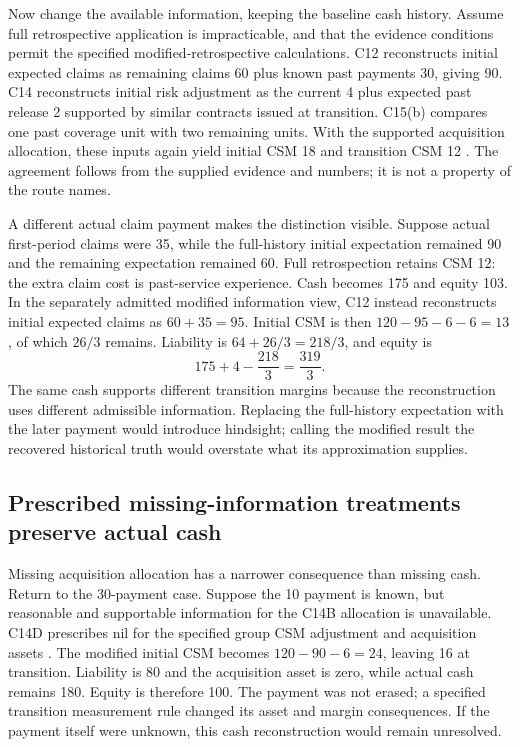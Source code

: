 Now change the available information, keeping the baseline cash history.
Assume full retrospective application is impracticable, and that the evidence
conditions permit the specified modified-retrospective calculations. C12
reconstructs initial expected claims as remaining claims 60 plus known past
payments 30, giving 90. C14 reconstructs initial risk adjustment as the current
4 plus expected past release 2 supported by similar contracts issued at
transition. C15(b) compares one past coverage unit with two remaining units.
With the supported acquisition allocation, these inputs again yield initial
CSM 18 and transition CSM 12 \citep[IFRS~17.C6--C8,C12,C14--C15]{eu20231803}.
The agreement follows from the supplied evidence and numbers; it is not a
property of the route names.

A different actual claim payment makes the distinction visible. Suppose actual
first-period claims were 35, while the full-history initial expectation remained
90 and the remaining expectation remained 60. Full retrospection retains
CSM 12: the extra claim cost is past-service experience. Cash becomes 175 and
equity 103. In the separately admitted modified information view, C12 instead
reconstructs initial expected claims as \(60+35=95\). Initial CSM is then
\(120-95-6-6=13\), of which \(26/3\) remains. Liability is
\(64+26/3=218/3\), and equity is
\[
 175+4-\frac{218}{3}=\frac{319}{3}.
\]
The same cash supports different transition margins because the reconstruction
uses different admissible information. Replacing the full-history expectation
with the later payment would introduce hindsight; calling the modified result
the recovered historical truth would overstate what its approximation supplies.

\subsection{Prescribed missing-information treatments preserve actual cash}
\label{sec:insurance-transition-acquisition-origins}

Missing acquisition allocation has a narrower consequence than missing cash.
Return to the 30-payment case. Suppose the 10 payment is known, but reasonable
and supportable information for the C14B allocation is unavailable. C14D
prescribes nil for the specified group CSM adjustment and acquisition assets
\citep[IFRS~17.C14B--C14D]{eu20231803}. The modified initial CSM becomes
\(120-90-6=24\), leaving 16 at transition. Liability is 80 and the
acquisition asset is zero, while actual cash remains 180. Equity is therefore
100. The payment was not erased; a specified transition measurement rule changed
its asset and margin consequences. If the payment itself were unknown, this
cash reconstruction would remain unresolved.

